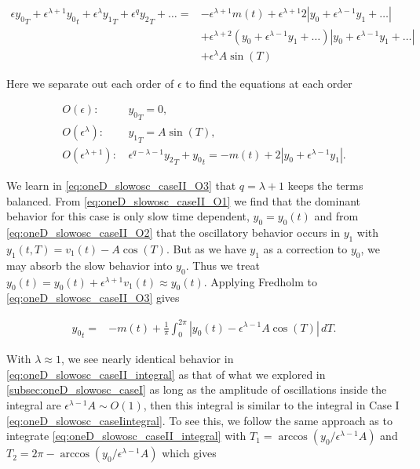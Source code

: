 \begin{equation*}
\begin{aligned}
\epsilon {y_0}_T+\epsilon^{\lambda+1} {y_0}_t+\epsilon^\lambda {y_1}_T+\epsilon^q {y_2}_T+\ldots=&-\epsilon^{\lambda+1}m(t)+\epsilon^{\lambda+1} 2|y_0+\epsilon^{\lambda-1} y_1 +\ldots|\\
&+ \epsilon^{\lambda+2}( y_0+\epsilon^{\lambda-1} y_1 +\ldots)| y_0+\epsilon^{\lambda-1} y_1 +\ldots|\\
&+\epsilon^\lambda A\sin(T) 
\end{aligned}
\end{equation*}

Here we separate out each order of $\epsilon$ to find the equations at each order

\begin{align} \label{eq:oneD_slowosc_caseII_O1}
O(\epsilon): &\, {y_0}_T=0,\\ \label{eq:oneD_slowosc_caseII_O2}
O(\epsilon^\lambda):  &\, {y_1}_T = A\sin(T),\\ \label{eq:oneD_slowosc_caseII_O3}
O(\epsilon^{\lambda+1}): &\, \epsilon^{q-\lambda-1}{y_2}_T+ {y_0}_t = -m(t) +2|y_0+\epsilon^{\lambda-1}y_1|.
\end{align}

We learn in \eqref{eq:oneD_slowosc_caseII_O3} that $q=\lambda+1$ keeps the terms balanced. From \eqref{eq:oneD_slowosc_caseII_O1} we find that the dominant behavior for this case is only slow time dependent, $y_0=y_0(t)$ and from \eqref{eq:oneD_slowosc_caseII_O2} that the oscillatory behavior occurs in $y_1$ with $y_1(t,T)=v_1(t)-A\cos(T)$. But as we have $y_1$ as a correction to $y_0$, we may absorb the slow behavior into $y_0$. Thus we treat $y_0(t)=y_0(t)+\epsilon^{\lambda+1} v_1(t)\approx y_0(t)$. Applying Fredholm to \eqref{eq:oneD_slowosc_caseII_O3} gives 

\begin{equation}\label{eq:oneD_slowosc_caseII_integral}
\begin{aligned}
{y_0}_t=& -m(t)+\frac{1}{\pi}\int_0^{2\pi}|y_0(t)-\epsilon^{\lambda-1}A\cos(T)|\,dT.
\end{aligned}
\end{equation}

With $\lambda\approx1$, we see nearly identical behavior in \eqref{eq:oneD_slowosc_caseII_integral} as that of what we explored in \autoref{subsec:oneD_slowosc_caseI} as long as the amplitude of oscillations inside the integral are $\epsilon^{\lambda-1}A\sim O(1)$, then this integral is similar to the integral in Case I \eqref{eq:oneD_slowosc_caseIintegral}. To see this, we follow the same approach as to integrate \eqref{eq:oneD_slowosc_caseII_integral} with $T_1=\arccos(y_0/\epsilon^{\lambda-1}A)$ and $T_2=2\pi- \arccos(y_0/\epsilon^{\lambda-1}A)$ which gives

